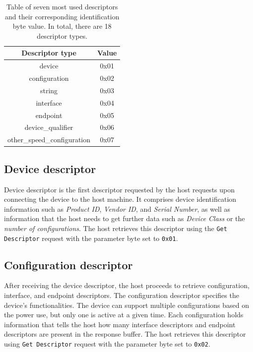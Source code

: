 \begin{table}[ht]
    \centering
    \begin{tabular}{|c|c|} \hline
        \textbf{Descriptor type} & \textbf{Value} \\ \hline
                          device & 0x01           \\ \hline
                   configuration & 0x02           \\ \hline
                          string & 0x03           \\ \hline
                       interface & 0x04           \\ \hline
                        endpoint & 0x05           \\ \hline
               device\_qualifier & 0x06           \\ \hline
     other\_speed\_configuration & 0x07           \\ \hline

    \end{tabular}
    \caption{Table of seven most used descriptors and their corresponding identification byte value. In total, there are 18 descriptor types.}
    \label{tab:descriptor_table}
\end{table}

\subsection*{Device descriptor}
Device descriptor is the first descriptor requested by the host requests upon connecting the device to the host machine. It comprises device identification information such as \emph{Product ID}, \emph{Vendor ID}, and \emph{Serial Number}, as well as information that the host needs to get further data such as \emph{Device Class} or the \emph{number of configurations}. The host retrieves this descriptor using the \verb|Get Descriptor| request with the parameter byte set to \verb|0x01|.

\subsection*{Configuration descriptor}
After receiving the device descriptor, the host proceeds to retrieve configuration, interface, and endpoint descriptors. The configuration descriptor specifies the device's functionalities. The device can support multiple configurations based on the power use, but only one is active at a given time. Each configuration holds information that tells the host how many interface descriptors and endpoint descriptors are present in the response buffer. The host retrieves this descriptor using \verb|Get Descriptor| request with the parameter byte set to \verb|0x02|.

